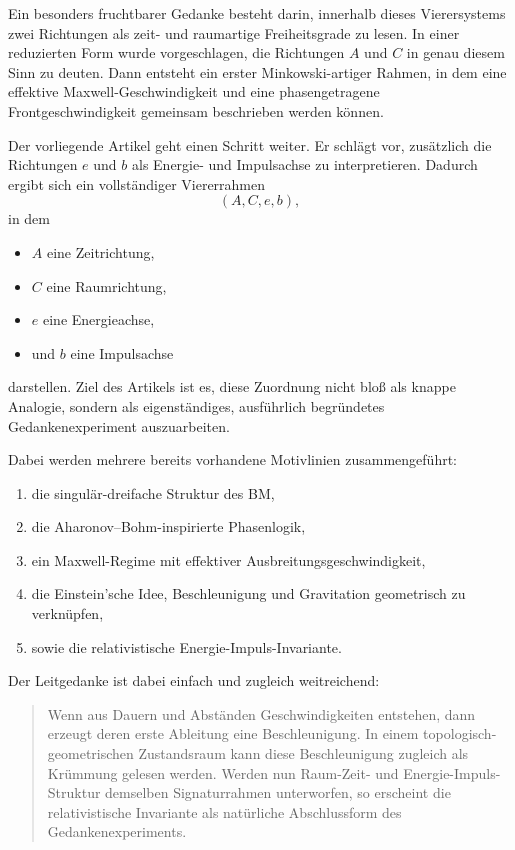 \documentclass[11pt,a4paper]{article}
\theoremstyle{definition}
\theoremstyle{plain}
\begin{document}
	Ein besonders fruchtbarer Gedanke besteht darin, innerhalb dieses Vierersystems zwei Richtungen als zeit- und raumartige Freiheitsgrade zu lesen. In einer reduzierten Form wurde vorgeschlagen, die Richtungen $A$ und $C$ in genau diesem Sinn zu deuten. Dann entsteht ein erster Minkowski-artiger Rahmen, in dem eine effektive Maxwell-Geschwindigkeit und eine phasengetragene Frontgeschwindigkeit gemeinsam beschrieben werden können.
	
	Der vorliegende Artikel geht einen Schritt weiter. Er schlägt vor, zusätzlich die Richtungen $e$ und $b$ als Energie- und Impulsachse zu interpretieren. Dadurch ergibt sich ein vollständiger Viererrahmen
	\[
	(A,C,e,b),
	\]
	in dem
	\begin{itemize}[leftmargin=2em]
		\item $A$ eine Zeitrichtung,
		\item $C$ eine Raumrichtung,
		\item $e$ eine Energieachse,
		\item und $b$ eine Impulsachse
	\end{itemize}
	darstellen. Ziel des Artikels ist es, diese Zuordnung nicht bloß als knappe Analogie, sondern als eigenständiges, ausführlich begründetes Gedankenexperiment auszuarbeiten.
	
	Dabei werden mehrere bereits vorhandene Motivlinien zusammengeführt:
	\begin{enumerate}[leftmargin=2em]
		\item die singulär-dreifache Struktur des BM,
		\item die Aharonov--Bohm-inspirierte Phasenlogik,
		\item ein Maxwell-Regime mit effektiver Ausbreitungsgeschwindigkeit,
		\item die Einstein’sche Idee, Beschleunigung und Gravitation geometrisch zu verknüpfen,
		\item sowie die relativistische Energie-Impuls-Invariante.
	\end{enumerate}
	
	Der Leitgedanke ist dabei einfach und zugleich weitreichend:
	\begin{quote}
		Wenn aus Dauern und Abständen Geschwindigkeiten entstehen, dann erzeugt deren erste Ableitung eine Beschleunigung. In einem topologisch-geometrischen Zustandsraum kann diese Beschleunigung zugleich als Krümmung gelesen werden. Werden nun Raum-Zeit- und Energie-Impuls-Struktur demselben Signaturrahmen unterworfen, so erscheint die relativistische Invariante als natürliche Abschlussform des Gedankenexperiments.
	\end{quote}
	
\end{document}
